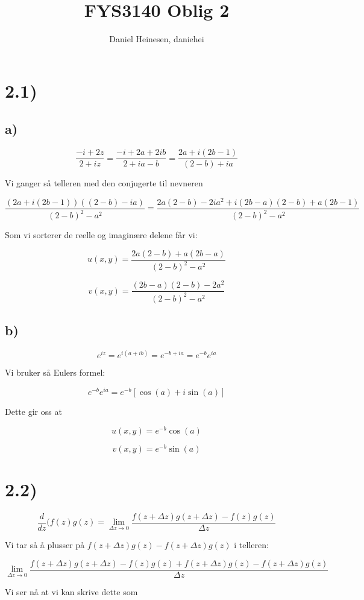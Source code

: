 \documentclass[a4paper,norsk, 10pt]{article}
\title{FYS3140 Oblig 2}
\author{Daniel Heinesen, daniehei}
\begin{document}
\maketitle

\section*{2.1)}
\subsection*{a)}
$$
\frac{-i + 2z}{2+iz} = \frac{-i + 2a + 2ib}{2 + ia - b} = \frac{2a + i(2b-1)}{(2-b) +ia}
$$

Vi ganger så telleren med den conjugerte til nevneren

$$
\frac{(2a + i(2b-1)) ((2-b) -ia)}{(2-b)^2 - a^2} = \frac{2a(2-b) - 2ia^2 + i(2b-a)(2-b) + a(2b-1)}{(2-b)^2 - a^2}
$$

Som vi sorterer de reelle og imaginære delene får vi:

$$
u(x,y) = \frac{2a(2-b) + a(2b-a)}{(2-b)^2 - a^2}
$$

$$
v(x,y) = \frac{(2b-a)(2-b) - 2a^2}{(2-b)^2 - a^2}
$$

\subsection*{b)}

$$
e^{iz} = e^{i(a+ib)} = e^{-b + ia} = e^{-b}e^{ia}
$$

Vi bruker så Eulers formel:

$$
e^{-b}e^{ia} = e^{-b}[\cos(a) + i\sin(a)]
$$

Dette gir oss at

$$
u(x,y) = e^{-b}\cos(a)
$$

$$
v(x,y) = e^{-b}\sin(a)
$$

\section*{2.2)}
$$
\frac{d}{dz}(f(z)g(z) = \lim_{\Delta z \rightarrow 0} \frac{f(z+\Delta z)g(z+\Delta z) - f(z)g(z)}{\Delta z}
$$

Vi tar så å plusser på $f(z+\Delta z)g(z)-f(z+\Delta z)g(z)$ i telleren:

$$
\lim_{\Delta z \rightarrow 0} \frac{f(z+\Delta z)g(z+\Delta z) - f(z)g(z) + f(z+\Delta z)g(z)-f(z+\Delta z)g(z)}{\Delta z}
$$

Vi ser nå at vi kan skrive dette som
\end{document}
